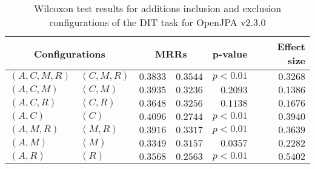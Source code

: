 
\begin{table}
\begin{spacing}{1.2}
\centering
\caption{Wilcoxon test results for additions inclusion and exclusion configurations of the DIT task for OpenJPA v2.3.0}
\label{table:versus-wilcox-openjpa-dit-additions}
\begin{tabular}{ll|rr|rr}
\toprule
      \multicolumn{2}{c|}{Configurations} &          \multicolumn{2}{c|}{MRRs} &       p-value & Effect size \\
\midrule
 $(A,C,M,R)$ &  $(C,M,R)$ & $0.3833$ & $0.3544$ & $p<0.01$ &    $0.3268$ \\
   $(A,C,M)$ &    $(C,M)$ & $0.3935$ & $0.3236$ & $0.2093$ &    $0.1386$ \\
   $(A,C,R)$ &    $(C,R)$ & $0.3648$ & $0.3256$ & $0.1138$ &    $0.1676$ \\
     $(A,C)$ &      $(C)$ & $0.4096$ & $0.2744$ & $p<0.01$ &    $0.3940$ \\
   $(A,M,R)$ &    $(M,R)$ & $0.3916$ & $0.3317$ & $p<0.01$ &    $0.3639$ \\
     $(A,M)$ &      $(M)$ & $0.3349$ & $0.3157$ & $0.0357$ &    $0.2282$ \\
     $(A,R)$ &      $(R)$ & $0.3568$ & $0.2563$ & $p<0.01$ &    $0.5402$ \\
\bottomrule
\end{tabular}

\end{spacing}
\end{table}

